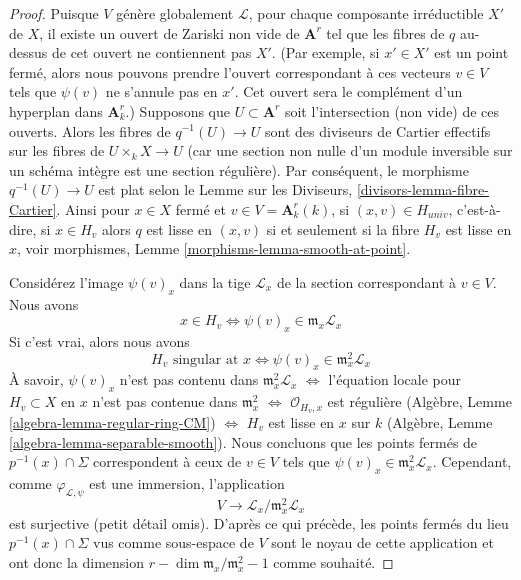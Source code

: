 \begin{proof}
\medskip\noindent
Puisque $V$ génère globalement $\mathcal{L}$, pour chaque composante
irréductible $X'$ de $X$, il existe un ouvert de Zariski non vide
de $\mathbf{A}^r$ tel que les fibres de $q$ au-dessus de cet ouvert
ne contiennent pas $X'$. (Par exemple, si $x' \in X'$ est un point
fermé, alors nous pouvons prendre l'ouvert correspondant à ces
vecteurs $v \in V$ tels que $\psi(v)$ ne s'annule pas en $x'$. Cet
ouvert sera le complément d'un hyperplan dans $\mathbf{A}^r_k$.)
Supposons que $U \subset \mathbf{A}^r$ soit l'intersection (non vide)
de ces ouverts. Alors les fibres de $q^{-1}(U) \to U$ sont des
diviseurs de Cartier effectifs sur les fibres de $U \times_k X \to U$
(car une section non nulle d'un module inversible sur un schéma
intègre est une section régulière). Par conséquent, le morphisme
$q^{-1}(U) \to U$ est plat selon le Lemme sur les Diviseurs,
\ref{divisors-lemma-fibre-Cartier}. Ainsi pour $x \in X$ fermé et $v \in V
= \mathbf{A}^r_k(k)$, si $(x, v) \in H_{univ}$, c'est-à-dire, si $x \in
H_v$ alors $q$ est lisse en $(x, v)$ si et seulement si la fibre $H_v$ est
lisse en $x$, voir morphismes, Lemme \ref{morphisms-lemma-smooth-at-point}.

\medskip\noindent
Considérez l'image $\psi(v)_x$ dans la tige
$\mathcal{L}_x$ de la section correspondant à $v \in V$. Nous avons
$$
x \in H_v \Leftrightarrow \psi(v)_x \in \mathfrak m_x\mathcal{L}_x
$$
Si c'est vrai, alors nous avons
$$
H_v\text{ singular at }x \Leftrightarrow
\psi(v)_x \in \mathfrak m_x^2\mathcal{L}_x
$$
À savoir, $\psi(v)_x$ n'est pas contenu dans
$\mathfrak m_x^2\mathcal{L}_x$
$\Leftrightarrow$ l'équation locale pour $H_v
\subset X$ en $x$ n'est pas contenue dans
$\mathfrak m_x^2$ $\Leftrightarrow$
$\mathcal{O}_{H_v, x}$ est régulière (Algèbre,
Lemme \ref{algebra-lemma-regular-ring-CM})
$\Leftrightarrow$ $H_v$ est lisse en $x$ sur $k$
(Algèbre, Lemme
\ref{algebra-lemma-separable-smooth}). Nous concluons
que les points fermés de $p^{-1}(x) \cap \Sigma$
correspondent à ceux de $v \in V$ tels que $\psi(v)_x
\in \mathfrak m_x^2\mathcal{L}_x$. Cependant, comme
$\varphi_{\mathcal{L}, \psi}$ est une immersion, l'application
$$
V \longrightarrow \mathcal{L}_x/\mathfrak m_x^2\mathcal{L}_x
$$
est surjective (petit détail omis). D'après ce qui précède, les
points fermés du lieu $p^{-1}(x) \cap \Sigma$ vus comme
sous-espace de $V$ sont le noyau de cette application et ont donc la
dimension $r - \dim \mathfrak m_x/\mathfrak m_x^2 - 1$ comme souhaité.
\end{proof}






